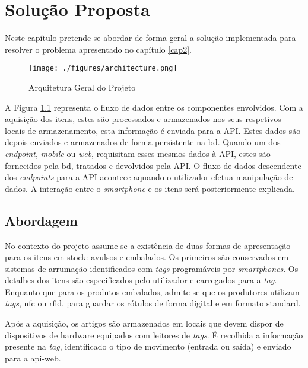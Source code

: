 %
%
\chapter{Solução Proposta} \label{cap3}

Neste capítulo pretende-se abordar de forma geral a solução implementada para resolver o problema apresentado no capítulo \ref{cap2}.

\begin{figure}[H]
	\centering
	\texttt{[image: ./figures/architecture.png]}
	\caption{Arquitetura Geral do Projeto}
	\label{project-general-architecture}
\end{figure}


A Figura \ref{project-general-architecture} representa o fluxo de dados entre os componentes envolvidos. Com a aquisição dos itens, estes são processados e armazenados nos seus respetivos locais de armazenamento, esta informação é enviada para a API. Estes dados são depois enviados e armazenados de forma persistente na \acrfull{bd}. Quando um dos \textit{endpoint}, \textit{mobile} ou \textit{web}, requisitam esses mesmos dados à API, estes são fornecidos pela \acrshort{bd}, tratados e devolvidos pela API. O fluxo de dados descendente dos \textit{endpoints} para a API acontece aquando o utilizador efetua manipulação de dados. A interação entre o \textit{smartphone} e os itens será posteriormente explicada.

%
%
\section{Abordagem}\label{sec31}

No contexto do projeto assume-se a existência de duas formas de apresentação para os itens em stock: avulsos e embalados. Os primeiros são conservados em sistemas de arrumação identificados com \textit{tags} programáveis por \textit{smartphones}. Os detalhes dos itens são especificados pelo utilizador e carregados para a \textit{tag}. Enquanto que para os produtos embalados, admite-se que os produtores utilizam \textit{tags}, \acrfull{nfc} ou \acrfull{rfid}, para guardar os rótulos de forma digital e em formato standard.

Após a aquisição, os artigos são armazenados em locais que devem dispor de dispositivos de hardware equipados com leitores de \textit{tags}. É recolhida a informação presente na \textit{tag}, identificado o tipo de movimento (entrada ou saída) e enviado para a \gls{api-web}.

